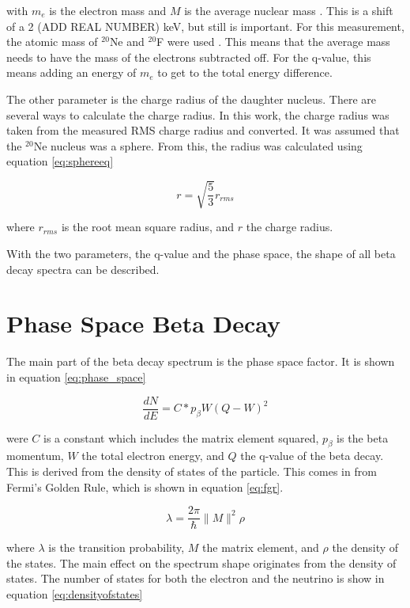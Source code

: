 with $m_{e}$ is the electron mass and $M$ is the average nuclear mass \cite{Hol74}.
This is a shift of a 2 (ADD REAL NUMBER) keV, but still is important.
For this measurement, the atomic mass of $^{20}$Ne and $^{20}$F were used \cite{Pfe12}.
This means that the average mass needs to have the mass of the electrons subtracted off. 
For the q-value, this means adding an energy of $m_{e}$ to get to the total energy difference.

The other parameter is the charge radius of the daughter nucleus.
There are several ways to calculate the charge radius.
In this work, the charge radius was taken from the measured RMS charge radius and converted.
It was assumed that the $^{20}$Ne nucleus was a sphere. 
From this, the radius was calculated using equation \ref{eq:sphereeq}

\begin{equation}
	r = \sqrt{\frac{5}{3}}r_{rms}	
	\label{eq:sphereeq}
\end{equation}

where $r_{rms}$ is the root mean square radius, and $r$ the charge radius.

With the two parameters, the q-value and the phase space, the shape of all beta decay spectra can be described.

\section{Phase Space Beta Decay}
The main part of the beta decay spectrum is the phase space factor.
It is shown in equation \ref{eq:phase_space}

\begin{equation}
	\frac{dN}{dE} = C * p_{\beta}W(Q - W)^{2}
	\label{eq:phase_space}
\end{equation}

were $C$ is a constant which includes the matrix element squared, $p_{\beta}$ is the beta momentum, $W$ the total electron energy, and $Q$ the q-value of the beta decay.
This is derived from the density of states of the particle.
This comes in from Fermi's Golden Rule, which is shown in equation \ref{eq:fgr}.

\begin{equation}
	\lambda = \frac{2\pi}{\hbar}\|M\|^{2}\rho
	\label{eq:fgr}
\end{equation}

where $\lambda$ is the transition probability, $M$ the matrix element, and $\rho$ the density of the states.
The main effect on the spectrum shape originates from the density of states.
The number of states for both the electron and the neutrino is show in equation \ref{eq:densityofstates}

